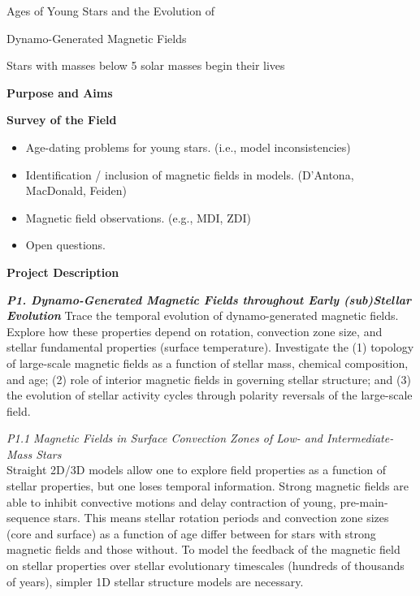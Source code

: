 \documentclass[12pt,a4paper]{article}
\begin{document}
\begin{center}
	{\bf {\LARGE Ages of Young Stars and the Evolution of 
	
	Dynamo-Generated Magnetic Fields}} 
	
%	
\end{center}
\vspace{\baselineskip}

Stars with masses below 5 solar masses begin their lives

{\bf \large Purpose and Aims}

{\bf \large Survey of the Field}
\begin{itemize}
	\item Age-dating problems for young stars. (i.e., model inconsistencies)
	\item Identification / inclusion of magnetic fields in models. (D'Antona, MacDonald, Feiden)
	\item Magnetic field observations. (e.g., MDI, ZDI)
	\item Open questions.
\end{itemize}

{\bf \large Project Description}

\textbf{\emph{P1. Dynamo-Generated Magnetic Fields throughout Early (sub)Stellar Evolution}}
Trace the temporal evolution of dynamo-generated magnetic fields. Explore how these properties depend on rotation, convection zone size, and stellar fundamental properties (surface temperature). Investigate the (1) topology of large-scale magnetic fields as a function of stellar mass, chemical composition, and age; (2) role of interior magnetic fields in governing stellar structure; and (3) the evolution of stellar activity cycles through polarity reversals of the large-scale field.

\emph{P1.1 Magnetic Fields in Surface Convection Zones of Low- and Intermediate-Mass Stars} \\
Straight 2D/3D models allow one to explore field properties as a function of stellar properties, but one loses temporal information. Strong magnetic fields are able to inhibit convective motions and delay contraction of young, pre-main-sequence stars. This means stellar rotation periods and convection zone sizes (core and surface) as a function of age differ between for stars with strong magnetic fields and those without. To model the feedback of the magnetic field on stellar properties over stellar evolutionary timescales (hundreds of thousands of years), simpler 1D stellar structure models are necessary. 
\end{document}
